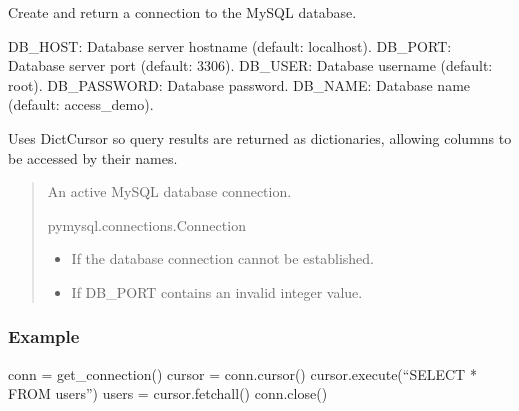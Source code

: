 \documentclass[letterpaper,10pt,english]{sphinxmanual}
\begin{document}
\begin{fulllineitems}
\label{\detokenize{modules:app.db.get_connection}}
\pysigstartsignatures
\pysiglinewithargsret
{}
{}
{}
\pysigstopsignatures
\sphinxAtStartPar
Create and return a connection to the MySQL database.
\begin{description}
\sphinxAtStartPar
DB\_HOST: Database server hostname (default: localhost).
DB\_PORT: Database server port (default: 3306).
DB\_USER: Database username (default: root).
DB\_PASSWORD: Database password.
DB\_NAME: Database name (default: access\_demo).

\end{description}

\sphinxAtStartPar
Uses DictCursor so query results are returned as dictionaries,
allowing columns to be accessed by their names.
\begin{quote}\begin{description}
\sphinxAtStartPar
An active MySQL database connection.

\sphinxAtStartPar
pymysql.connections.Connection

\begin{itemize}
\item {} 
\sphinxAtStartPar
{} \textendash{} If the database connection cannot be established.

\item {} 
\sphinxAtStartPar
{} \textendash{} If DB\_PORT contains an invalid integer value.

\end{itemize}

\end{description}\end{quote}
\subsubsection*{Example}

\sphinxAtStartPar
conn = get\_connection()
cursor = conn.cursor()
cursor.execute(“SELECT * FROM users”)
users = cursor.fetchall()
conn.close()

\end{fulllineitems}
\end{document}
